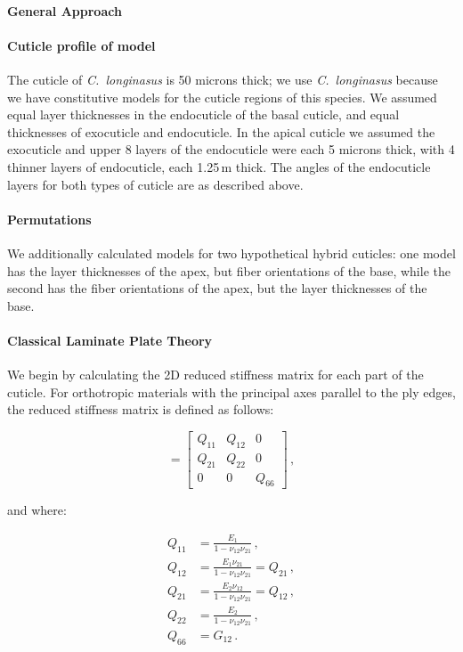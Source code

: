 \documentclass[twocolumn, linenumbers, superscriptaddress, nofootinbib]{revtex4-1}
\begin{document}
			\paragraph*{General Approach}
			
			\paragraph*{Cuticle profile of model}
				The cuticle of \textit{C.~longinasus} is 50 microns thick; we use \textit{C.~longinasus} because we have constitutive models for the cuticle regions of this species.
				We assumed equal layer thicknesses in the endocuticle of the basal cuticle, and equal thicknesses of exocuticle and endocuticle.
				In the apical cuticle we assumed the exocuticle and upper 8 layers of the endocuticle were each 5 microns thick, with 4 thinner layers of endocuticle, each 1.25\,{\textmu}m thick.
				The angles of the endocuticle layers for both types of cuticle are as described above.
				
			\paragraph*{Permutations}
				We additionally calculated models for two hypothetical hybrid cuticles: one model has the layer thicknesses of the apex, but fiber orientations of the base, while the second has the fiber orientations of the apex, but the layer thicknesses of the base.
				
			\paragraph*{Classical Laminate Plate Theory}
				We begin by calculating the 2D reduced stiffness matrix for each part of the cuticle.
				For orthotropic materials with the principal axes parallel to the ply edges, the reduced stiffness matrix is defined as follows:
				
				\begin{equation}
				[Q] =
					\begin{bmatrix}
						Q_{11} & Q_{12} & 0 \\
						Q_{21} & Q_{22} & 0 \\
						0 & 0 & Q_{66}
					\end{bmatrix}\,,
				\end{equation}
				
				and where:
				
				\begin{equation}
				\begin{aligned}
					Q_{11} & = \frac{E_{1}}{1 - \nu_{12}\nu_{21}}\,, \\
					Q_{12} & = \frac{E_{1}\nu_{21}}{1 - \nu_{12}\nu_{21}} = Q_{21}\,, \\
					Q_{21} & = \frac{E_{2}\nu_{12}}{1 - \nu_{12}\nu_{21}} = Q_{12}\,, \\
					Q_{22} & = \frac{E_{2}}{1 - \nu_{12}\nu_{21}}\,, \\
					Q_{66} & = G_{12}\,.
				\end{aligned}
				\end{equation}
				
\end{document}
